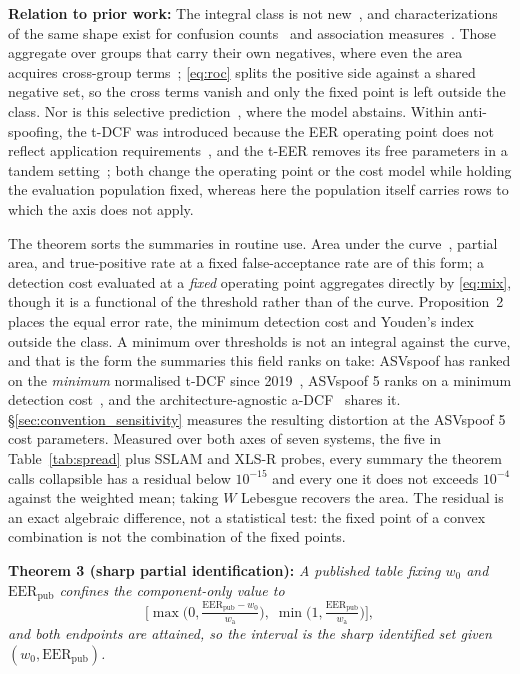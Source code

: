 \documentclass{article}
\begin{document}
\vspace{2pt}
\noindent\textbf{Relation to prior work: } The integral class is not new~\cite{wieand1989}, and
characterizations of the same shape exist for confusion counts~\cite{prati2026} and association
measures~\cite{kenah2025}. Those aggregate over groups that carry their own negatives, where even the area
acquires cross-group terms~\cite{matos2026}; \eqref{eq:roc} splits the positive side against a shared negative
set, so the cross terms vanish and only the fixed point is left outside the class. Nor is this selective
prediction~\cite{elyaniv2010}, where the model abstains. Within anti-spoofing, the t-DCF was introduced because
the EER operating point does not reflect application requirements~\cite{kinnunen2020tdcf}, and the t-EER removes
its free parameters in a tandem setting~\cite{kinnunen2024teer}; both change the operating point or the cost
model while holding the evaluation population fixed, whereas here the population itself carries rows to
which the axis does not apply.

\vspace{2pt}
The theorem sorts the summaries in routine use. Area under the curve~\cite{hanley1982}, partial area, and
true-positive rate at a fixed false-acceptance rate are of this form; a detection cost evaluated at
a \emph{fixed} operating point aggregates directly by \eqref{eq:mix}, though it is a functional of
the threshold rather than of the curve. Proposition~2 places the equal error rate, the minimum
detection cost and Youden's index outside the class. A minimum over thresholds is not an
integral against the curve, and that is the form the summaries this field ranks on take: ASVspoof
has ranked on the \emph{minimum} normalised t-DCF since 2019~\cite{kinnunen2020tdcf}, ASVspoof 5
ranks on a minimum detection cost~\cite{asvspoof5}, and the architecture-agnostic
a-DCF~\cite{shim2024adcf} shares it. \S\ref{sec:convention_sensitivity} measures the resulting
distortion at the ASVspoof 5 cost parameters.
Measured over both axes of seven systems, the five in Table~\ref{tab:spread} plus SSLAM and
XLS-R probes, every summary the theorem calls collapsible has a
residual below $10^{-15}$ and every one it does not exceeds $10^{-4}$ against the weighted mean; taking $W$ Lebesgue recovers the area.
The residual is an exact algebraic difference, not a statistical test: the fixed point of a convex combination is not the combination of the fixed points.

\vspace{2pt}\noindent\textbf{Theorem 3 (sharp partial identification): } \emph{A published table
fixing $w_0$ and $\mathrm{EER}_{\text{pub}}$ confines the component-only value to}
\begin{equation}
\Big[\max\Big(0,\tfrac{\mathrm{EER}_{\text{pub}} - w_0}{w_{\mathrm{a}}}\Big),\;
      \min\Big(1,\tfrac{\mathrm{EER}_{\text{pub}}}{w_{\mathrm{a}}}\Big)\Big],
\label{eq:interval}
\end{equation}
\emph{and both endpoints are attained, so the interval is the sharp identified set given $(w_0,\mathrm{EER}_{\text{pub}})$.}
\end{document}
